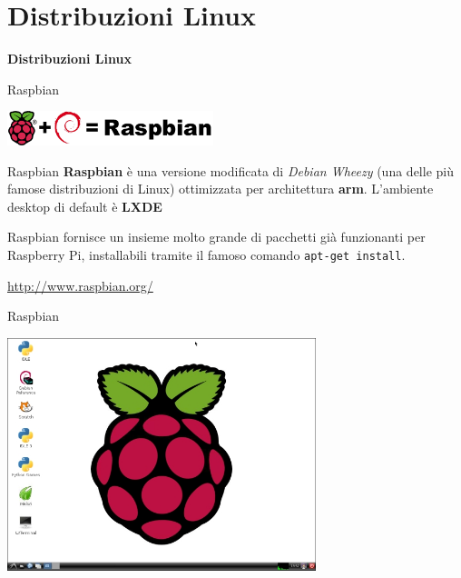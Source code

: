 \documentclass[xcolor=svgnames,11pt]{beamer}
\begin{document}
\section{Distribuzioni Linux}

\begin{frame}{}
\begin{center}
\begin{Huge}
{\color{green_raspi} \textbf{Distribuzioni Linux}}
\end{Huge}
\end{center}
\end{frame}

\begin{frame}{Raspbian}
\begin{center}
\includegraphics[width=6cm]{raspbian_logo.png}
\end{center}

\pause
\medskip

\begin{block}{Raspbian}
\textbf{Raspbian} \`e una versione modificata di \emph{Debian Wheezy} (una delle pi\`u famose distribuzioni di Linux) ottimizzata per architettura \textbf{arm}. L'ambiente desktop di default \`e \textbf{LXDE}
\end{block}

\pause
\medskip

Raspbian fornisce un insieme molto grande di pacchetti gi\`a funzionanti per Raspberry Pi, installabili tramite il famoso comando \texttt{apt-get install}.

\pause
\medskip
\begin{center}
\url{http://www.raspbian.org/}
\end{center}
\end{frame}

\begin{frame}{Raspbian}
\begin{center}
\includegraphics[width=9cm]{raspbian-desktop.jpg}
\end{center}
\end{frame}
\end{document}

